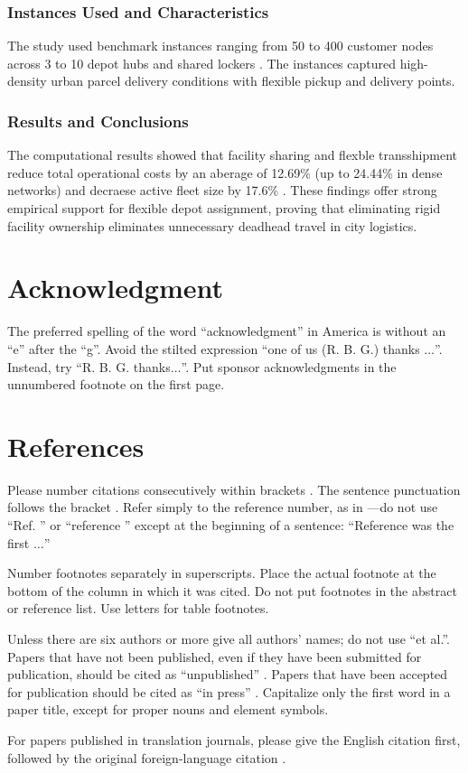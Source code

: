\documentclass[conference]{IEEEtran}
\begin{document}
\subsubsection{Instances Used and Characteristics}
The study used benchmark instances ranging from 50 to 400 customer nodes across 3 to 10 depot hubs and shared lockers \cite{li2026multidepot}.
The instances captured high-density urban parcel delivery conditions with flexible pickup and delivery points.

\subsubsection{Results and Conclusions}
The computational results showed that facility sharing and flexble transshipment reduce total operational costs by an aberage of 12.69\% (up to 24.44\% in dense networks) and decraese active fleet size by 17.6\% \cite{li2026multidepot}.
These findings offer strong empirical support for flexible depot assignment, proving that eliminating rigid facility ownership eliminates unnecessary deadhead travel in city logistics.

\section*{Acknowledgment}

The preferred spelling of the word ``acknowledgment'' in America is without 
an ``e'' after the ``g''. Avoid the stilted expression ``one of us (R. B. 
G.) thanks $\ldots$''. Instead, try ``R. B. G. thanks$\ldots$''. Put sponsor 
acknowledgments in the unnumbered footnote on the first page.

\section*{References}

Please number citations consecutively within brackets \cite{b1}. The 
sentence punctuation follows the bracket \cite{b2}. Refer simply to the reference 
number, as in \cite{b3}---do not use ``Ref. \cite{b3}'' or ``reference \cite{b3}'' except at 
the beginning of a sentence: ``Reference \cite{b3} was the first $\ldots$''

Number footnotes separately in superscripts. Place the actual footnote at 
the bottom of the column in which it was cited. Do not put footnotes in the 
abstract or reference list. Use letters for table footnotes.

Unless there are six authors or more give all authors' names; do not use 
``et al.''. Papers that have not been published, even if they have been 
submitted for publication, should be cited as ``unpublished'' \cite{b4}. Papers 
that have been accepted for publication should be cited as ``in press'' \cite{b5}. 
Capitalize only the first word in a paper title, except for proper nouns and 
element symbols.

For papers published in translation journals, please give the English 
citation first, followed by the original foreign-language citation \cite{b6}.



\vspace{12pt}
\end{document}
